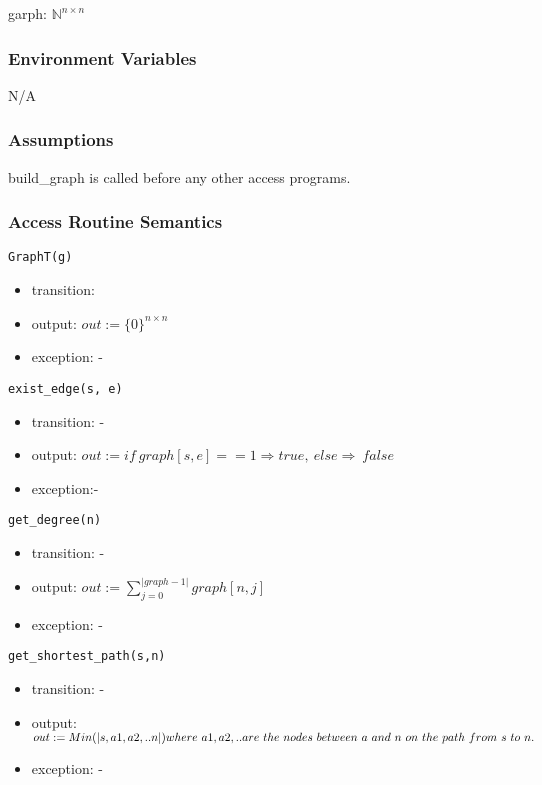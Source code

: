 \documentclass[12pt, titlepage]{article}
\begin{document}
garph: ${\mathbb{N}}^ {n\times n}$ 


\subsubsection{Environment Variables}

N/A

\subsubsection{Assumptions}


{build\_graph} is called before any other access programs.



\subsubsection{Access Routine Semantics}

\noindent \texttt{GraphT(g)}
\begin{itemize}
\item transition: 
\item output: $out:= \{0\}^{n \times n}$
\item exception: -
\end{itemize}

\noindent \texttt{exist\_edge(s, e)}
\begin{itemize}
\item transition: -
\item output: $out:= if\ graph[s,e] ==1\Rightarrow true,\ else\Rightarrow\ false$
\item exception:-  
\end{itemize}

\noindent \texttt{get\_degree(n)}
\begin{itemize}
\item transition: -
\item output: $out:= {\sum_{j=0}^{|graph-1|}{graph[n,j]}}$
\item exception: -
\end{itemize}

\noindent \texttt{get\_shortest\_path(s,n)}
\begin{itemize}
\item transition: -
\item output: $out:=Min(|s,a1,a2,..n|) \\where\ a1, a2, .. are\ the\ nodes\ between\ a\ and\ n\ on\ the\ path\ from\ s\ to\ n.$
\item exception: -   
\end{itemize}
\end{document}
